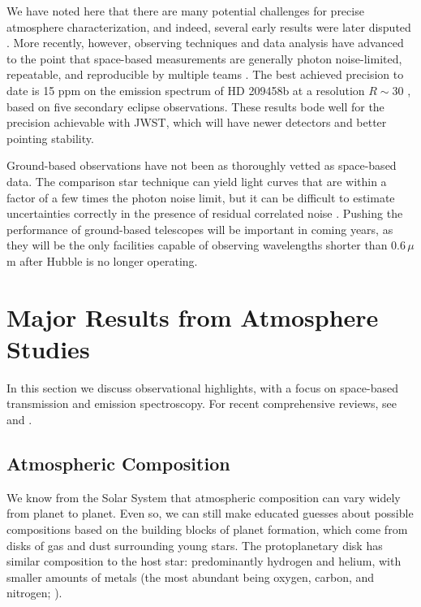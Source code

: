 \documentclass[graybox,natbib,nosecnum]{svmult}
\begin{document}
We have noted here that there are many potential challenges for precise atmosphere characterization, and indeed, several early results were later disputed \citep[e.g.][]{tinetti07, swain08, gibson11}. More recently, however, observing techniques and data analysis have advanced to the point that space-based measurements are generally photon noise-limited, repeatable, and reproducible by multiple teams \citep[e.g.][]{deming13, kreidberg14a, ingalls16}. The best achieved precision to date is 15 ppm on the emission spectrum of HD 209458b at a resolution $R\sim 30$ \citep{line16}, based on five secondary eclipse observations. These results bode well for the precision achievable with JWST, which will have newer detectors and better pointing stability. 

Ground-based observations have not been as thoroughly vetted as space-based data.  The comparison star technique can yield light curves that are within a factor of a few times the photon noise limit, but it can be difficult to estimate uncertainties correctly in the presence of residual correlated noise \citep[e.g.][]{jordan13, beatty16}.  Pushing the performance of ground-based telescopes will be important in coming years, as they will be the only facilities capable of observing wavelengths shorter than $0.6\,\mu$m after Hubble is no longer operating. 

\section{Major Results from Atmosphere Studies}
In this section we discuss observational highlights, with a focus on space-based transmission and emission spectroscopy.  For recent comprehensive reviews, see \cite{crossfield15} and \cite{deming17}. 

\subsection{Atmospheric Composition}
We know from the Solar System that atmospheric composition can vary widely from planet to planet. Even so, we can still make educated guesses about possible compositions based on the building blocks of planet formation,  which come from disks of gas and dust surrounding young stars.  The protoplanetary disk has similar composition to the host star: predominantly hydrogen and helium, with smaller amounts of metals (the most abundant being oxygen, carbon, and nitrogen; \citealt{anders89}).  %
\end{document}
